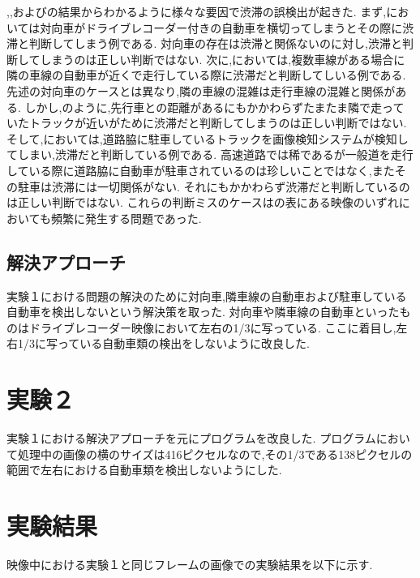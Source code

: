 ,,およびの結果からわかるように様々な要因で渋滞の誤検出が起きた.
まず,においては対向車がドライブレコーダー付きの自動車を横切ってしまうとその際に渋滞と判断してしまう例である.
対向車の存在は渋滞と関係ないのに対し,渋滞と判断してしまうのは正しい判断ではない.
次に,においては,複数車線がある場合に隣の車線の自動車が近くで走行している際に渋滞だと判断してしいる例である.
先述の対向車のケースとは異なり,隣の車線の混雑は走行車線の混雑と関係がある.
しかし,のように,先行車との距離があるにもかかわらずたまたま隣で走っていたトラックが近いがために渋滞だと判断してしまうのは正しい判断ではない.
そして,においては,道路脇に駐車しているトラックを画像検知システムが検知してしまい,渋滞だと判断している例である.
高速道路では稀であるが一般道を走行している際に道路脇に自動車が駐車されているのは珍しいことではなく,またその駐車は渋滞には一切関係がない.
それにもかかわらず渋滞だと判断しているのは正しい判断ではない.
これらの判断ミスのケースはの表にある映像のいずれにおいても頻繁に発生する問題であった.

\subsection{解決アプローチ}
実験１における問題の解決のために対向車,隣車線の自動車および駐車している自動車を検出しないという解決策を取った.
対向車や隣車線の自動車といったものはドライブレコーダー映像において左右の1/3に写っている.
ここに着目し,左右1/3に写っている自動車類の検出をしないように改良した.

\section{実験２}
実験１における解決アプローチを元にプログラムを改良した.
プログラムにおいて処理中の画像の横のサイズは416ピクセルなので,その1/3である138ピクセルの範囲で左右における自動車類を検出しないようにした.

\section{実験結果}
映像中における実験１と同じフレームの画像での実験結果を以下に示す.

